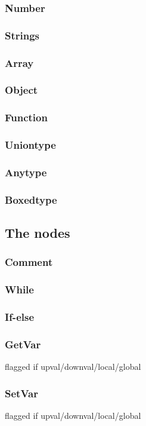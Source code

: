 \subsubsection{Number}
\subsubsection{Strings}
\subsubsection{Array}
\subsubsection{Object}
\subsubsection{Function}
\subsubsection{Uniontype}
\subsubsection{Anytype}
\subsubsection{Boxedtype}
\subsection{The nodes}

\subsubsection{Comment}

\subsubsection{While}
\subsubsection{If-else}
\subsubsection{GetVar}
flagged if upval/downval/local/global
\subsubsection{SetVar}
flagged if upval/downval/local/global

